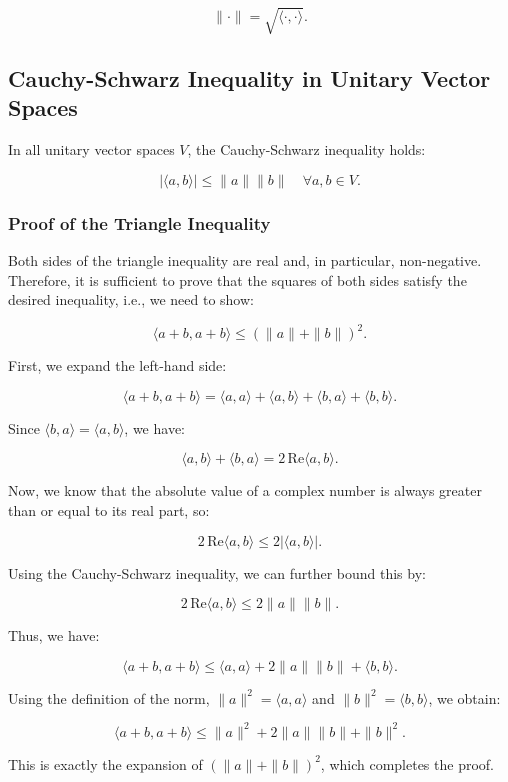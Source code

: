 \[
\| \cdot \| = \sqrt{\langle \cdot, \cdot \rangle}.
\]

\subsection{Cauchy-Schwarz Inequality in Unitary Vector Spaces}

In all unitary vector spaces \( V \), the Cauchy-Schwarz inequality holds:

\[
| \langle a, b \rangle | \leq \| a \| \| b \| \quad \forall a, b \in V.
\]

\subsubsection{Proof of the Triangle Inequality}

Both sides of the triangle inequality are real and, in particular, non-negative. 
Therefore, it is sufficient to prove that the squares of both sides satisfy the desired inequality, i.e., we need to show:

\[
\langle a + b, a + b \rangle \leq {(\|a\| + \|b\|)}^2.
\]

First, we expand the left-hand side:

\[
\langle a + b, a + b \rangle = \langle a, a \rangle + \langle a, b \rangle + \langle b, a \rangle + \langle b, b \rangle.
\]

Since \( \langle b, a \rangle = \langle a, b \rangle \), we have:

\[
\langle a, b \rangle + \langle b, a \rangle = 2 \, \text{Re} \langle a, b \rangle.
\]

Now, we know that the absolute value of a complex number is always greater than or equal to its real part, so:

\[
2 \, \text{Re} \langle a, b \rangle \leq 2 |\langle a, b \rangle|.
\]

Using the Cauchy-Schwarz inequality, we can further bound this by:

\[
2 \, \text{Re} \langle a, b \rangle \leq 2 \|a\| \|b\|.
\]

Thus, we have:

\[
\langle a + b, a + b \rangle \leq \langle a, a \rangle + 2 \|a\| \|b\| + \langle b, b \rangle.
\]

Using the definition of the norm, \( \|a\|^2 = \langle a, a \rangle \) and \( \|b\|^2 = \langle b, b \rangle \), we obtain:

\[
\langle a + b, a + b \rangle \leq \|a\|^2 + 2 \|a\| \|b\| + \|b\|^2.
\]

This is exactly the expansion of \( {(\|a\| + \|b\|)}^2 \), which completes the proof.
\QED

